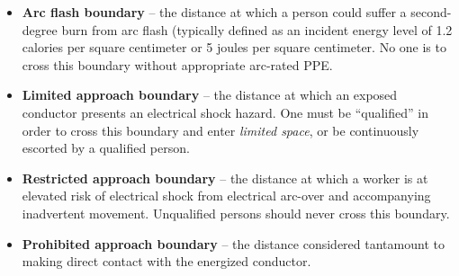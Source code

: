 





 






\begin{itemize}
\item{} {\bf Arc flash boundary} -- the distance at which a person could suffer a second-degree burn from arc flash (typically defined as an incident energy level of 1.2 calories per square centimeter or 5 joules per square centimeter.  No one is to cross this boundary without appropriate arc-rated PPE.
\item{} {\bf Limited approach boundary} -- the distance at which an exposed conductor presents an electrical shock hazard.  One must be ``qualified'' in order to cross this boundary and enter {\it limited space}, or be continuously escorted by a qualified person.
\item{} {\bf Restricted approach boundary} -- the distance at which a worker is at elevated risk of electrical shock from electrical arc-over and accompanying inadvertent movement.  Unqualified persons should never cross this boundary.
\item{} {\bf Prohibited approach boundary} -- the distance considered tantamount to making direct contact with the energized conductor.
\end{itemize}

\vskip 10pt

\filbreak

